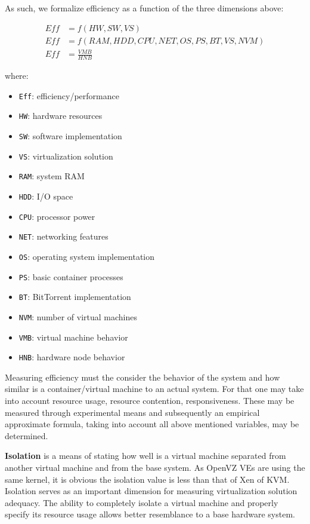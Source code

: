 As such, we formalize efficiency as a function of the three dimensions above:

\begin{align}
Eff & = f(HW, SW, VS)\\
Eff & = f(RAM, HDD, CPU, NET, OS, PS, BT, VS, NVM)\\
Eff &= \frac{VMB}{HNB}
\end{align}

where:

\begin{multicols}{2}
    \begin{itemize}
      \item \texttt{Eff}: efficiency/performance
      \item \texttt{HW}: hardware resources
      \item \texttt{SW}: software implementation
      \item \texttt{VS}: virtualization solution
      \item \texttt{RAM}: system RAM
      \item \texttt{HDD}: I/O space
      \item \texttt{CPU}: processor power
      \item \texttt{NET}: networking features
      \item \texttt{OS}: operating system implementation
      \item \texttt{PS}: basic container processes
      \item \texttt{BT}: BitTorrent implementation
      \item \texttt{NVM}: number of virtual machines
      \item \texttt{VMB}: virtual machine behavior
      \item \texttt{HNB}: hardware node behavior
    \end{itemize}
\end{multicols}

Measuring efficiency must the consider the behavior of the system and how
similar is a container/virtual machine to an actual system. For that one may
take into account resource usage, resource contention, responsiveness. These
may be measured through experimental means and subsequently an empirical
approximate formula, taking into account all above mentioned variables, may be
determined.

\textbf{Isolation} is a means of stating how well is a virtual machine
separated from another virtual machine and from the base system. As OpenVZ VEs
are using the same kernel, it is obvious the isolation value is less than that
of Xen of KVM. Isolation serves as an important dimension for measuring
virtualization solution adequacy. The ability to completely isolate a virtual
machine and properly specify its resource usage allows better resemblance to a
base hardware system.

